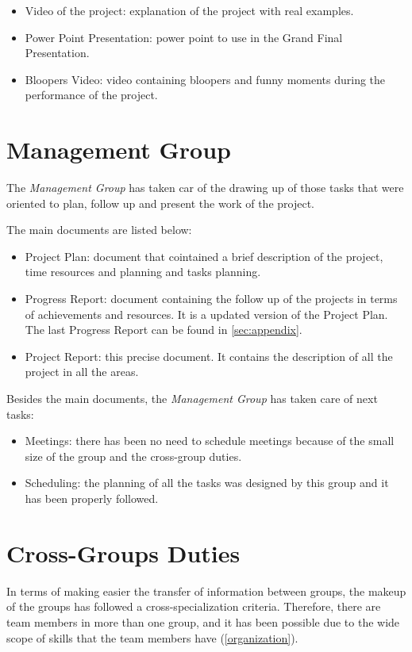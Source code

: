 \documentclass[11pt,a4paper,spanish]{book}  %
\theoremstyle{definition}  %
\theoremstyle{plain}  %
\theoremstyle{remark}  %
\begin{document}
\begin{itemize}
\item Video of the project: explanation of the project with real examples.
\item Power Point Presentation: power point to use in the Grand Final Presentation.
\item Bloopers Video: video containing bloopers and funny moments during the performance of the project.
\end{itemize}

	\section{Management Group}

The \textit{Management Group} has taken car of the drawing up of those tasks that were oriented to plan, follow up and present the work of the project.

The main documents are listed below:

\begin{itemize}
\item Project Plan: document that cointained a brief description of the project, time resources and planning and tasks planning.
\item Progress Report: document containing the follow up of the projects in terms of achievements and resources. It is a updated version of the Project Plan. The last Progress Report can be found in \ref{sec:appendix}.
\item Project Report: this precise document. It contains the description of all the project in all the areas.
\end{itemize}

Besides the main documents, the \textit{Management Group} has taken care of next tasks:

\begin{itemize}
\item Meetings: there has been no need to schedule meetings because of the small size of the group and the cross-group duties.
\item  Scheduling: the planning of all the tasks was designed by this group and it has been properly followed.
\end{itemize}


\section{Cross-Groups Duties}

In terms of making easier the transfer of information between groups, the makeup of the groups has followed a cross-specialization criteria. Therefore, there are team members in more than one group, and it has been possible due to the wide scope of skills that the team members have (\ref{organization}).
\end{document}
